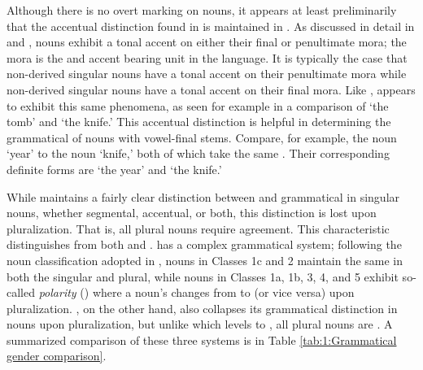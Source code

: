 \documentclass[output=paper]{LSP/langsci}
\begin{document}
Although there is no overt  marking on  nouns, it appears at least preliminarily that the accentual  distinction found in  is maintained in . As discussed in detail in \citet{Hyman1981somali} and \citet{GreenMorrison2016},  nouns exhibit a tonal accent on either their final or penultimate mora; the mora is the  and accent bearing unit in the language. It is typically the case that non-derived  singular nouns have a tonal accent on their penultimate mora while non-derived  singular nouns have a tonal accent on their final mora. Like ,  appears to exhibit this same phenomena, as seen for example in a comparison of   `the tomb' and   `the knife.' This accentual distinction is helpful in determining the grammatical  of nouns with vowel-final stems. Compare, for example, the  noun  `year' to the  noun  `knife,' both of which take the same  . Their corresponding definite forms are  `the year' and  `the knife.'
 
 While  maintains a fairly clear distinction between  and  grammatical  in singular nouns, whether segmental, accentual, or both, this distinction is lost upon pluralization. That is, all plural nouns require   agreement. This characteristic distinguishes  from both  and .  has a complex grammatical  system; following the noun classification adopted in \citet{Greenetal2015}, nouns in Classes 1c and 2 maintain the same  in both the singular and plural, while nouns in Classes 1a, 1b, 3, 4, and 5 exhibit so-called \textit{ polarity} (\citealt{Meinhof1912}) where a noun's  changes from  to  (or vice versa) upon pluralization. , on the other hand, also collapses its grammatical  distinction in nouns upon pluralization, but unlike  which levels  to , all  plural nouns are . A summarized comparison of these three systems is in Table \ref{tab:1:Grammatical gender comparison}. 
 
\end{document}
